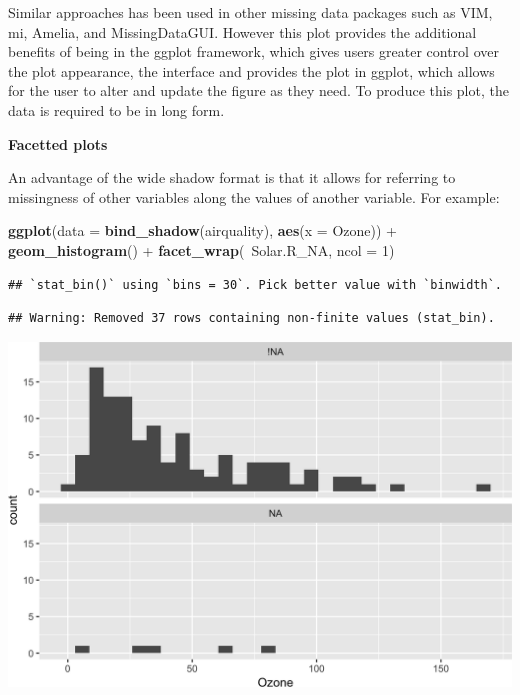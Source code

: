 \documentclass[]{article}
\newenvironment{Shaded}{\begin{snugshade}}{\end{snugshade}}
\newcommand{\KeywordTok}[1]{\textcolor[rgb]{0.13,0.29,0.53}{\textbf{{#1}}}}
\newcommand{\DataTypeTok}[1]{\textcolor[rgb]{0.13,0.29,0.53}{{#1}}}
\newcommand{\DecValTok}[1]{\textcolor[rgb]{0.00,0.00,0.81}{{#1}}}
\newcommand{\StringTok}[1]{\textcolor[rgb]{0.31,0.60,0.02}{{#1}}}
\newcommand{\NormalTok}[1]{{#1}}
\begin{document}
Similar approaches has been used in other missing data packages such as
VIM, mi, Amelia, and MissingDataGUI. However this plot provides the
additional benefits of being in the ggplot framework, which gives users
greater control over the plot appearance, the interface and provides the
plot in ggplot, which allows for the user to alter and update the figure
as they need. To produce this plot, the data is required to be in long
form.

\textbf{Facetted plots}

An advantage of the wide shadow format is that it allows for referring
to missingness of other variables along the values of another variable.
For example:

\begin{Shaded}
\begin{Highlighting}[]
\KeywordTok{ggplot}\NormalTok{(}\DataTypeTok{data =} \KeywordTok{bind_shadow}\NormalTok{(airquality),}
       \KeywordTok{aes}\NormalTok{(}\DataTypeTok{x =} \NormalTok{Ozone)) +}\StringTok{ }
\StringTok{  }\KeywordTok{geom_histogram}\NormalTok{() +}\StringTok{ }
\StringTok{  }\KeywordTok{facet_wrap}\NormalTok{(~Solar.R_NA,}
             \DataTypeTok{ncol =} \DecValTok{1}\NormalTok{)}
\end{Highlighting}
\end{Shaded}

\begin{verbatim}
## `stat_bin()` using `bins = 30`. Pick better value with `binwidth`.
\end{verbatim}

\begin{verbatim}
## Warning: Removed 37 rows containing non-finite values (stat_bin).
\end{verbatim}

\includegraphics{jsm2017_files/figure-latex/unnamed-chunk-2-1.png}
\end{document}
